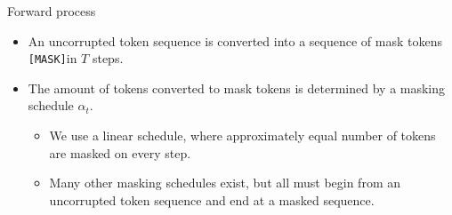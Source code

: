 \documentclass[normaltitle,first=orange,second=red,leqno]{aaltoslides}
\newcommand{\mask}{\texttt{[MASK]}}
\begin{document}

\begin{frame}{Forward process}
    \begin{itemize}
        \item<1-> An uncorrupted token sequence is converted into a sequence of mask tokens \mask in $T$ steps.
        \item<2-> The amount of tokens converted to mask tokens is determined by a masking schedule $\alpha_t$.
        \begin{itemize}
            \item We use a linear schedule, where approximately equal number of tokens are masked on every step.
            \item Many other masking schedules exist, but all must begin from an uncorrupted token sequence and end at a masked sequence.
        \end{itemize}
    \end{itemize}
\end{frame}
\end{document}
